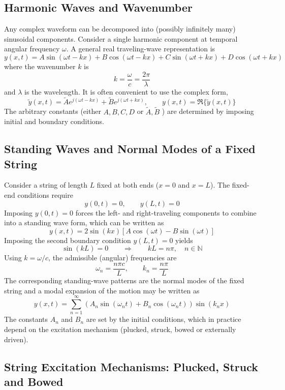 \subsection{Harmonic Waves and Wavenumber}

Any complex waveform can be decomposed into (possibly infinitely many) sinusoidal components. Consider a single harmonic component at temporal angular frequency \( \omega \). A general real traveling-wave representation is
\[
y(x,t) = A\sin(\omega t-kx) + B\cos(\omega t-kx) + C\sin(\omega t + kx) + D\cos(\omega t + kx)
\]
where the wavenumber \( k \) is
\[
k = \frac{\omega}{c} = \frac{2\pi}{\lambda}
\]
and \( \lambda \) is the wavelength. It is often convenient to use the complex form,
\[
\widetilde{y}(x,t) = \widetilde{A}e^{j(\omega t-kx)} + \widetilde{B}e^{j(\omega t + kx)},
\qquad
y(x,t) = \Re\{\widetilde{y}(x,t)\}
\]
The arbitrary constants (either \( A,B,C,D \) or \( \widetilde{A},\widetilde{B} \) ) are determined by imposing initial and boundary conditions.

\subsection{Standing Waves and Normal Modes of a Fixed String}

Consider a string of length \( L \) fixed at both ends (\( x = 0 \) and \( x = L \)). The fixed-end conditions require
\[
y(0,t) = 0,\qquad y(L,t) = 0
\]
Imposing \( y(0,t) = 0 \) forces the left- and right-traveling components to combine into a standing wave form, which can be written as
\[
y(x,t) = 2\sin(kx)\left[A\cos(\omega t)-B\sin(\omega t)\right]
\]
Imposing the second boundary condition \( y(L,t) = 0 \) yields
\[
\sin(kL) = 0
\qquad\Longrightarrow\qquad
kL = n\pi,\quad n\in\mathbb{N}
\]
Using \( k = \omega/c \), the admissible (angular) frequencies are
\[
\omega_n = \frac{n\pi c}{L},
\qquad
k_n = \frac{n\pi}{L}
\]
The corresponding standing-wave patterns are the normal modes of the fixed string and a modal expansion of the motion may be written as
\[
y(x,t) = \sum_{n = 1}^{\infty}\left(A_n\sin(\omega_n t) + B_n\cos(\omega_n t)\right)\sin(k_n x)
\]
The constants \( A_n \) and \( B_n \) are set by the initial conditions, which in practice depend on the excitation mechanism (plucked, struck, bowed or externally driven).

\subsection{String Excitation Mechanisms: Plucked, Struck and Bowed}

